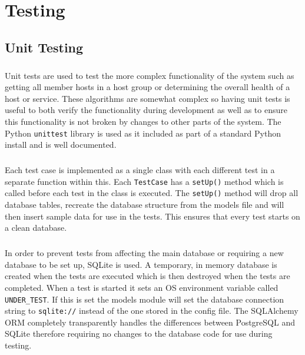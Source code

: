 \documentclass[bsc,logo,twoside,singlespacing,notimes]{infthesis}
\begin{document}
\chapter{Testing}
\section{Unit Testing}
\paragraph*{}
	Unit tests are used to test the more complex functionality of the system such
	as getting all member hosts in a host group or determining the overall health
	of a host or service.  These algorithms are somewhat complex so having unit
	tests is useful to both verify the functionality during development as well
	as to ensure this functionality is not broken by changes to other parts of the
	system.  The Python \texttt{unittest} library is used as it included as part of
	a standard Python install and is well documented.
	
\paragraph*{}
	Each test case is implemented as a single class with each different test in a
	separate function within this.  Each \texttt{TestCase} has a \texttt{setUp()}
	method which is called before each test in the class is executed.  The
	\texttt{setUp()} method will drop all database tables, recreate the database
	structure from the models file and will then insert sample data for use in the
	tests.  This ensures that every test starts on a clean database.
	
\paragraph*{}
	In order to prevent tests from affecting the main database or requiring a new
	database to be set up, SQLite is used.  A temporary, in memory database is
	created when the tests are executed which is then destroyed when the tests are
	completed.  When a test is started it sets an OS environment variable called
	\texttt{UNDER\_TEST}.  If this is set the models module will set the database
	connection string to \texttt{sqlite://} instead of the one stored in the config
	file. The SQLAlchemy ORM completely transparently handles the differences
	between PostgreSQL and SQLite therefore requiring no changes to the database
	code for use during testing.
	
\end{document}
